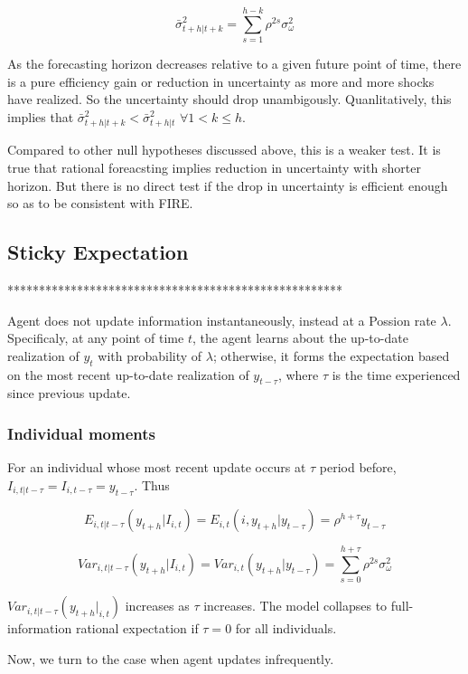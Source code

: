 \documentclass[]{article}
\begin{document}
$$\bar \sigma^2_{t+h|t+k} = \sum^{h-k}_{s=1}\rho^{2s} \sigma^2_{\omega}$$

As the forecasting horizon decreases relative to a given future point of time, there is a pure efficiency gain or reduction in uncertainty as more and more shocks have realized. So the uncertainty should drop unambigously. Quanlitatively, this implies that $\bar \sigma^2_{t+h|t+k} < \bar \sigma^2_{t+h|t}$ $\forall 1<k\leq h$. 

Compared to other null hypotheses discussed above, this is a weaker test. It is true that rational foreacsting implies reduction in uncertainty with shorter horizon. But there is no direct test if the drop in uncertainty is efficient enough so as to be consistent with FIRE. 

\subsection{Sticky Expectation}

*****************************************************

Agent does not update information instantaneously, instead at a Possion rate $\lambda$. Specificaly, at any point of time $t$, the agent learns about the up-to-date realization of $y_t$ with probability of $\lambda$; otherwise, it forms the expectation based on the most recent up-to-date realization of $y_{t-\tau}$, where $\tau$ is the time experienced since previous update. 

\subsubsection{Individual moments} 

For an individual whose most recent update occurs at $\tau$ period before, $I_{i,t|t-\tau} = I_{i,t-\tau} = y_{t-\tau}$. Thus

$$E_{i,t|t-\tau}(y_{t+h}|I_{i,t}) = E_{i,t}(i,y_{t+h}|y_{t-\tau}) = \rho^{h+\tau} y_{t-\tau}$$

$$Var_{i,t|t-\tau}(y_{t+h}|I_{i,t}) = Var_{i,t}(y_{t+h}|y_{t-\tau}) = \sum^{h+\tau}_{s=0}\rho^{2s} \sigma^2_{\omega}$$

$Var_{i,t|t-\tau}(y_{t+h}|_{i,t})$ increases as $\tau$ increases. The model collapses to full-information rational expectation if $\tau=0$ for all individuals. 

Now, we turn to the case when agent updates infrequently. 
\end{document}
